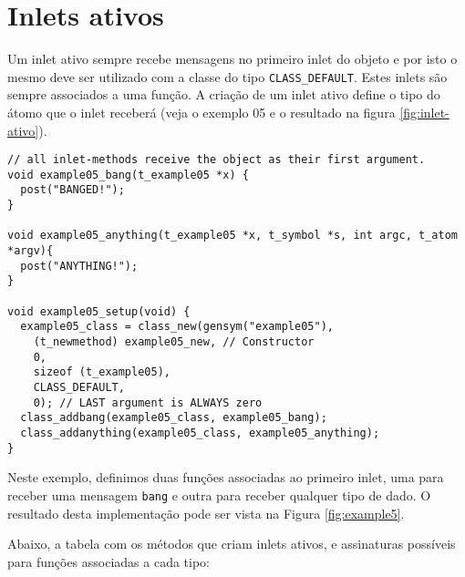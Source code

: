 


\section{Inlets ativos}

Um inlet ativo sempre recebe mensagens no primeiro inlet do objeto e por isto
o mesmo deve ser utilizado com a classe do tipo \texttt{CLASS\_DEFAULT}.
Estes inlets são sempre associados a uma função.
A criação de um inlet ativo define o tipo do átomo que o inlet receberá (veja o
exemplo 05 e o resultado na figura \ref{fig:inlet-ativo}).

\begin{lstlisting}[caption=Exemplo de objeto com inlet ativo]
// all inlet-methods receive the object as their first argument.
void example05_bang(t_example05 *x) { 
  post("BANGED!");
}

void example05_anything(t_example05 *x, t_symbol *s, int argc, t_atom *argv){
  post("ANYTHING!");
}

void example05_setup(void) {
  example05_class = class_new(gensym("example05"),
    (t_newmethod) example05_new, // Constructor
    0, 
    sizeof (t_example05),
    CLASS_DEFAULT,
    0); // LAST argument is ALWAYS zero
  class_addbang(example05_class, example05_bang);
  class_addanything(example05_class, example05_anything);
}
\end{lstlisting}

Neste exemplo, definimos duas funções associadas ao primeiro inlet, uma para
receber uma mensagem \texttt{bang} e outra para receber qualquer tipo de dado.
O resultado desta implementação pode ser vista na Figura \ref{fig:example5}.


Abaixo, a tabela com os métodos que criam inlets ativos,
e assinaturas possíveis para funções associadas a cada tipo:

